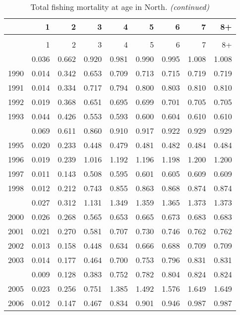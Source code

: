\documentclass[
]{article}
\begin{document}
\begin{longtable}[t]{lrrrrrrrr}
\caption{\label{tab:North-region-FAA-table}Total fishing mortality at age in North.}\\
\toprule
  & 1 & 2 & 3 & 4 & 5 & 6 & 7 & 8+\\
\midrule
\endfirsthead
\caption[]{Total fishing mortality at age in North. \textit{(continued)}}\\
\toprule
  & 1 & 2 & 3 & 4 & 5 & 6 & 7 & 8+\\
\midrule
\endhead

\endfoot
\bottomrule
\endlastfoot
1989 & 0.036 & 0.662 & 0.920 & 0.981 & 0.990 & 0.995 & 1.008 & 1.008\\
1990 & 0.014 & 0.342 & 0.653 & 0.709 & 0.713 & 0.715 & 0.719 & 0.719\\
1991 & 0.014 & 0.334 & 0.717 & 0.794 & 0.800 & 0.803 & 0.810 & 0.810\\
1992 & 0.019 & 0.368 & 0.651 & 0.695 & 0.699 & 0.701 & 0.705 & 0.705\\
1993 & 0.044 & 0.426 & 0.553 & 0.593 & 0.600 & 0.604 & 0.610 & 0.610\\
\addlinespace
1994 & 0.069 & 0.611 & 0.860 & 0.910 & 0.917 & 0.922 & 0.929 & 0.929\\
1995 & 0.020 & 0.233 & 0.448 & 0.479 & 0.481 & 0.482 & 0.484 & 0.484\\
1996 & 0.019 & 0.239 & 1.016 & 1.192 & 1.196 & 1.198 & 1.200 & 1.200\\
1997 & 0.011 & 0.143 & 0.508 & 0.595 & 0.601 & 0.605 & 0.609 & 0.609\\
1998 & 0.012 & 0.212 & 0.743 & 0.855 & 0.863 & 0.868 & 0.874 & 0.874\\
\addlinespace
1999 & 0.027 & 0.312 & 1.131 & 1.349 & 1.359 & 1.365 & 1.373 & 1.373\\
2000 & 0.026 & 0.268 & 0.565 & 0.653 & 0.665 & 0.673 & 0.683 & 0.683\\
2001 & 0.021 & 0.270 & 0.581 & 0.707 & 0.730 & 0.746 & 0.762 & 0.762\\
2002 & 0.013 & 0.158 & 0.448 & 0.634 & 0.666 & 0.688 & 0.709 & 0.709\\
2003 & 0.014 & 0.177 & 0.464 & 0.700 & 0.753 & 0.796 & 0.831 & 0.831\\
\addlinespace
2004 & 0.009 & 0.128 & 0.383 & 0.752 & 0.782 & 0.804 & 0.824 & 0.824\\
2005 & 0.023 & 0.256 & 0.751 & 1.385 & 1.492 & 1.576 & 1.649 & 1.649\\
2006 & 0.012 & 0.147 & 0.467 & 0.834 & 0.901 & 0.946 & 0.987 & 0.987\\

\end{longtable}
\end{document}
